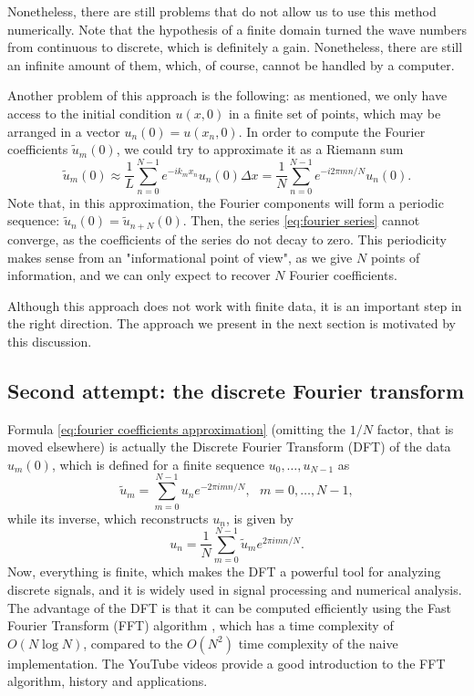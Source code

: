 \documentclass[a4paper,10pt]{report}
\begin{document}
Nonetheless, there are still problems that do not allow us to use this method numerically. Note that the hypothesis of a finite domain turned the wave numbers from continuous to discrete, which is definitely a gain. Nonetheless, there are still an infinite amount of them, which, of course, cannot be handled by a computer.

Another problem of this approach is the following: as mentioned, we only have access to the initial condition $u(x,0)$ in a finite set of points, which may be arranged in a vector $u_n(0) = u(x_n,0)$. In order to compute the Fourier coefficients $\tilde{u}_m(0)$, we could try to approximate it as a Riemann sum
\begin{equation}
    \label{eq:fourier coefficients approximation}
    \tilde{u}_m(0) \approx \frac{1}{L} \sum_{n=0}^{N-1} e^{-i k_m x_n} u_n(0) \Delta x = \frac{1}{N} \sum_{n=0}^{N-1} e^{-i 2\pi mn/N} u_n(0).
\end{equation}
Note that, in this approximation, the Fourier components will form a periodic sequence: $\tilde{u}_n(0) = \tilde{u}_{n+N}(0)$. Then, the series \eqref{eq:fourier series} cannot converge, as the coefficients of the series do not decay to zero. This periodicity makes sense from an "informational point of view", as we give $N$ points of information, and we can only expect to recover $N$ Fourier coefficients.

Although this approach does not work with finite data, it is an important step in the right direction. The approach we present in the next section is motivated by this discussion.

\subsection{Second attempt: the discrete Fourier transform}

Formula \eqref{eq:fourier coefficients approximation} (omitting the $1/N$ factor, that is moved elsewhere) is actually the Discrete Fourier Transform (DFT) of the data $u_m(0)$, which is defined for a finite sequence $u_0, \ldots, u_{N-1}$ as
\begin{equation}
    \label{eq:dft}
    \tilde{u}_m = \sum_{m=0}^{N-1} u_n e^{-2\pi i mn/N}, \ \ \ m = 0, \ldots, N-1,
\end{equation}
while its inverse, which reconstructs $u_n$, is given by
\begin{equation}
    u_n = \frac{1}{N} \sum_{m=0}^{N-1} \tilde{u}_m e^{2\pi i mn/N}.
\end{equation}
Now, everything is finite, which makes the DFT a powerful tool for analyzing discrete signals, and it is widely used in signal processing and numerical analysis. The advantage of the DFT is that it can be computed efficiently using the Fast Fourier Transform (FFT) algorithm \cite{cooley1965algorithm}, which has a time complexity of $O(N \log N)$, compared to the $O(N^2)$ time complexity of the naive implementation. The YouTube videos \cite{fft_veritasium, fft_reducible} provide a good introduction to the FFT algorithm, history and applications.
\end{document}
